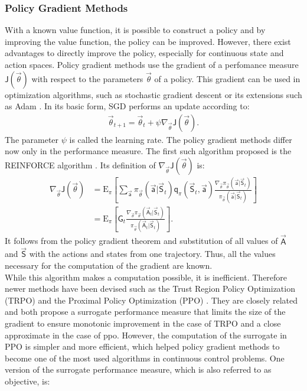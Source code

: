 \subsubsection{Policy Gradient Methods}
With a known value function, it is possible to construct a policy and by improving the value function, the policy can be improved. However, there exist advantages to directly improve the policy, especially for continuous state and action spaces. Policy gradient methods use the gradient of a perfomance measure $\mathsf{J}(\vec{\theta})$ with respect to the parameters $\vec{\theta}$ of a policy. This gradient can be used in optimization algorithms, such as stochastic gradient descent \cite[p. 201]{sutton_reinforcement_2018} or its extensions such as Adam \cite{kingma_adam_2017}. In its basic form, SGD performs an update according to:
\begin{align}
\vec{\theta}_{t+1} = \vec{\theta}_t + \psi \nabla_{\vec{\theta}} \mathsf{J}(\vec{\theta}). \label{eq:sgd}
\end{align} The parameter $\psi$ is called the learning rate. The policy gradient methods differ now only in the performance measure. The first such algorithm proposed is the REINFORCE algorithm \cite{williams_simple_1992}. Its definition of $\nabla_{\vec{\theta}} \mathsf{J}(\vec{\theta})$ is:
\begin{align}
\nabla_{\vec{\theta}} \mathsf{J}(\vec{\theta}) 
&= \mathrm{E}_\pi \left[ \sum_{\vec{\mathsf{a}}} \pi_{\vec{\theta}} (\vec{\mathsf{a}}\vert \vec{\mathsf{S}}_t) \mathsf{q}_\pi(\vec{\mathsf{S}}_t, \vec{\mathsf{a}})
\frac{\nabla_{\vec{\theta}} \pi_{\vec{\theta}}(\vec{\mathsf{a}}\vert \vec{\mathsf{S}}_t)}{\pi_{\vec{\theta}}(\vec{\mathsf{a}}\vert \vec{\mathsf{S}}_t)} \right]\label{eq:reinforce} \\
&= \mathrm{E}_\pi \left[\mathsf{G}_t \frac{\nabla_{\vec{\theta}} \pi_{\vec{\theta}}(\vec{\mathsf{A}}_t\vert \vec{\mathsf{S}}_t)}{\pi_{\vec{\theta}}(\vec{\mathsf{A}}_t\vert \vec{\mathsf{S}}_t)} \right]. \label{eq:reinforce2}
\end{align} It follows from the policy gradient theorem and substitution of all values of $\vec{\mathsf{A}}$ and $\vec{\mathsf{S}}$ with the actions and states from one trajectory. Thus, all the values necessary for the computation of the gradient are known. \cite[p.324-328]{sutton_reinforcement_2018} \\
While this algorithm makes a computation possible, it is inefficient. Therefore newer methods have been devised such as the Trust Region Policy Optimization (TRPO) \cite{schulman_trust_2015} and the Proximal Policy Optimization (PPO) \cite{schulman_proximal_2017}. They are closely related and both propose a surrogate performance measure that limits the size of the gradient to ensure monotonic improvement in the case of TRPO and a close approximate in the case of ppo. However, the computation of the surrogate in PPO is simpler and more efficient, which helped policy gradient methods to become one of the most used algorithms in continuous control problems. One version of the surrogate performance measure, which is also referred to as objective, is:
